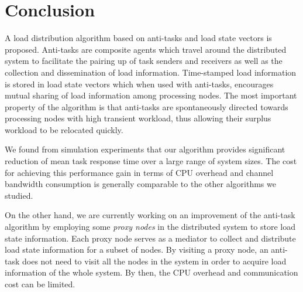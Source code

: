%

\chapter{Conclusion}


A load distribution algorithm based on 
anti-tasks and load state vectors is proposed.
Anti-tasks are composite agents which travel around the distributed
system to facilitate the pairing up of task senders and receivers 
as well as the collection and dissemination of load information.
Time-stamped load information is stored 
in load state vectors which when used with anti-tasks,
encourages mutual sharing of load information among processing nodes.
The most important property of the algorithm is that
anti-tasks are spontaneously directed towards processing nodes
with high transient workload, thus allowing their surplus workload
to be relocated quickly.

We found from simulation experiments that our algorithm provides 
significant reduction of mean task response time over a large range 
of system sizes.
The cost for achieving this performance gain in terms of
CPU overhead and channel bandwidth consumption is generally
comparable to the other algorithms we studied.
%

On the other hand, 
we are currently working on an improvement of the anti-task algorithm
by employing some {\it proxy nodes\/} in the distributed system 
to store load state information. 
Each proxy node serves as a mediator to collect and distribute
load state information for a subset of nodes.
By visiting a proxy node, an anti-task does not need to visit all
the nodes in the system in order to acquire load information of
the whole system.
By then, the CPU overhead and communication cost can be limited.


\chapterend
